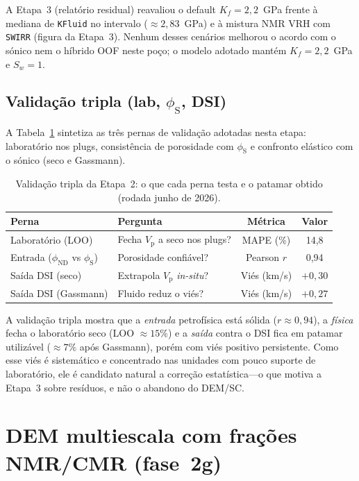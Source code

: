 \documentclass[11pt,a4paper]{article}
\numberwithin{equation}{section}
\newcommand{\phiND}{\ensuremath{\phi_{\mathrm{ND}}}}
\newcommand{\phiS}{\ensuremath{\phi_{\mathrm{S}}}}
\newcommand{\Vp}{\ensuremath{V_{\mathrm{p}}}}
\begin{document}
A Etapa~3 (relatório residual) reavaliou o default $K_f=2{,}2$~GPa frente à
mediana de \texttt{KFluid} no intervalo ($\approx 2{,}83$~GPa) e à mistura
NMR VRH com \texttt{SWIRR} (figura da Etapa~3).
Nenhum desses cenários melhorou o acordo com o sónico nem o híbrido OOF
neste poço; o modelo adotado mantém $K_f=2{,}2$~GPa e $S_w=1$.

\subsection{Validação tripla (lab, \phiS{}, DSI)}

A Tabela~\ref{tab:validation_triple} sintetiza as três pernas de validação
adotadas nesta etapa: laboratório nos plugs, consistência de porosidade com
\phiS{} e confronto elástico com o sónico (seco e Gassmann).

\begin{table}[H]
  \centering
  \caption{Validação tripla da Etapa~2: o que cada perna testa e o
           patamar obtido (rodada junho de 2026).}
  \label{tab:validation_triple}
  \small
  \begin{tabular}{llcc}
    \toprule
    Perna & Pergunta & Métrica & Valor \\
    \midrule
    Laboratório (LOO) & Fecha \Vp{} a seco nos plugs? & MAPE (\%) & 14,8 \\
    Entrada (\phiND{} vs \phiS) & Porosidade confiável? & Pearson $r$ & 0,94 \\
    Saída DSI (seco) & Extrapola \Vp{} \emph{in-situ}? & Viés (km/s) & $+0{,}30$ \\
    Saída DSI (Gassmann) & Fluido reduz o viés? & Viés (km/s) & $+0{,}27$ \\
    \bottomrule
  \end{tabular}
\end{table}

A validação tripla mostra que a \emph{entrada} petrofísica está sólida
($r \approx 0{,}94$), a \emph{física} fecha o laboratório seco (LOO $\approx 15\%$)
e a \emph{saída} contra o DSI fica em patamar utilizável ($\approx 7\%$ após
Gassmann), porém com viés positivo persistente.
Como esse viés é sistemático e concentrado nas unidades com pouco suporte de
laboratório, ele é candidato natural a correção estatística---o que motiva a
Etapa~3 sobre resíduos, e não o abandono do DEM/SC.

\section{DEM multiescala com frações NMR/CMR (fase~2g)}
\label{sec:multiscale_nmr}
\end{document}
